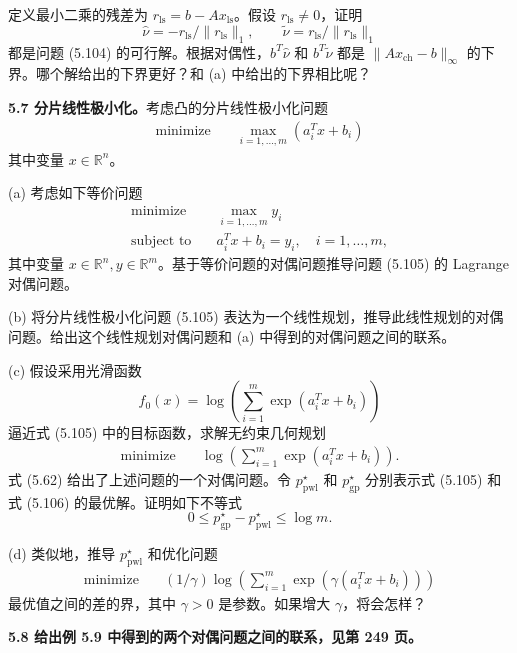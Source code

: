 \documentclass[UTF8, 12pt, fontset=fandol, oneside]{ctexart}
\begin{document}
定义最小二乘的残差为 $r_{\mathrm{ls}}=b-Ax_{\mathrm{ls}}$。假设 $r_{\mathrm{ls}}\neq 0$，证明
\[
\hat{\nu}=-r_{\mathrm{ls}}/\|r_{\mathrm{ls}}\|_1,\qquad \tilde{\nu}=r_{\mathrm{ls}}/\|r_{\mathrm{ls}}\|_1
\]
都是问题 (5.104) 的可行解。根据对偶性，$b^T\hat{\nu}$ 和 $b^T\tilde{\nu}$ 都是 $\|Ax_{\mathrm{ch}}-b\|_\infty$ 的下界。哪个解给出的下界更好？和 (a) 中给出的下界相比呢？

\noindent\textbf{5.7 分片线性极小化。}\quad 考虑凸的分片线性极小化问题
\begin{equation}
\begin{aligned}
\text{minimize}\quad & \max_{i=1,\ldots,m}(a_i^Tx+b_i)
\end{aligned}
\tag{5.105}
\end{equation}
其中变量 $x\in\mathbb{R}^n$。

(a) 考虑如下等价问题
\[
\begin{aligned}
\text{minimize}\quad & \max_{i=1,\ldots,m}y_i\\
\text{subject to}\quad & a_i^Tx+b_i=y_i,\quad i=1,\ldots,m,
\end{aligned}
\]
其中变量 $x\in\mathbb{R}^n, y\in\mathbb{R}^m$。基于等价问题的对偶问题推导问题 (5.105) 的 Lagrange 对偶问题。

(b) 将分片线性极小化问题 (5.105) 表达为一个线性规划，推导此线性规划的对偶问题。给出这个线性规划对偶问题和 (a) 中得到的对偶问题之间的联系。

(c) 假设采用光滑函数
\[
f_0(x)=\log\left(\sum_{i=1}^m\exp(a_i^Tx+b_i)\right)
\]
逼近式 (5.105) 中的目标函数，求解无约束几何规划
\begin{equation}
\begin{aligned}
\text{minimize}\quad & \log\left(\sum_{i=1}^m\exp(a_i^Tx+b_i)\right).
\end{aligned}
\tag{5.106}
\end{equation}
式 (5.62) 给出了上述问题的一个对偶问题。令 $p_{\mathrm{pwl}}^\star$ 和 $p_{\mathrm{gp}}^\star$ 分别表示式 (5.105) 和式 (5.106) 的最优解。证明如下不等式
\[
0\leq p_{\mathrm{gp}}^\star-p_{\mathrm{pwl}}^\star\leq \log m.
\]

(d) 类似地，推导 $p_{\mathrm{pwl}}^\star$ 和优化问题
\[
\begin{aligned}
\text{minimize}\quad & (1/\gamma)\log\left(\sum_{i=1}^m\exp(\gamma(a_i^Tx+b_i))\right)
\end{aligned}
\]
最优值之间的差的界，其中 $\gamma>0$ 是参数。如果增大 $\gamma$，将会怎样？

\noindent\textbf{5.8 给出例 5.9 中得到的两个对偶问题之间的联系，见第 249 页。}
\end{document}

